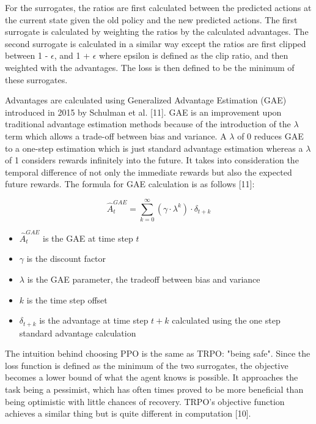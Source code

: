 \documentclass{article}
\begin{document}
	For the surrogates, the ratios are first calculated between the predicted actions at the current state given the old policy and the new predicted actions. The first surrogate is calculated by weighting the ratios by the calculated advantages. The second surrogate is calculated in a similar way except the ratios are first clipped between 1 - $\epsilon$, and 1 + $\epsilon$ where epsilon is defined as the clip ratio, and then weighted with the advantages. The loss is then defined to be the minimum of these surrogates.
	
	Advantages are calculated using Generalized Advantage Estimation (GAE) introduced in 2015 by Schulman et al. [11]. GAE is an improvement upon traditional advantage estimation methods because of the introduction of the $\lambda$ term which allows a trade-off between bias and variance. A $\lambda$ of 0 reduces GAE to a one-step estimation which is just standard advantage estimation whereas a $\lambda$ of 1 considers rewards infinitely into the future. It takes into consideration the temporal difference of not only the immediate rewards but also the expected future rewards. The formula for GAE calculation is as follows [11]:
	
	\begin{equation}
		\hat{A}^{GAE}_{t} = \sum_{k=0}^{\infty}(\gamma\cdot\lambda^{k})\cdot\delta_{t+k}
	\end{equation}
	\begin{itemize}
		\item $\hat{A}^{GAE}_{t}$ is the GAE at time step $t$
		\item $\gamma$ is the discount factor
		\item $\lambda$ is the GAE parameter, the tradeoff between bias and variance
		\item $k$ is the time step offset
		\item $\delta_{t+k}$ is the advantage at time step $t+k$ calculated using the one step standard advantage calculation
	\end{itemize}
	
	The intuition behind choosing PPO is the same as TRPO: "being safe". Since the loss function is defined as the minimum of the two surrogates, the objective becomes a lower bound of what the agent knows is possible. It approaches the task being a pessimist, which has often times proved to be more beneficial than being optimistic with little chances of recovery. TRPO's objective function achieves a similar thing but is quite different in computation [10].
	
\end{document}
